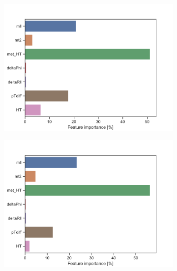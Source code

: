 \begin{figure}[H]
\begin{subfigure}[t!]{0.49\textwidth}
        \includegraphics[width = \textwidth]{Figures/WW/BDT/High_level/Low/featureImportance.pdf}
        \caption{}
        \label{fig:featWWLow}
    \end{subfigure}
    \begin{subfigure}[t!]{0.49\textwidth}
        \includegraphics[width = \textwidth]{Figures/Mono_Z/ML/BDT/High_level/Low/featureImportance.pdf}
        \caption{}
        \label{fig:featMonoZLow}
    \end{subfigure}
    \caption{}
    \label{fig:resExample}
\end{figure}

